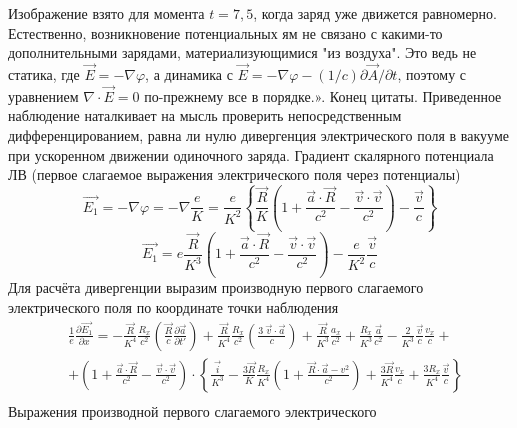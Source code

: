 \documentclass[11pt]{article}
\begin{document}
Изображение взято для момента \(t=7{,}5\), когда заряд уже движется
равномерно. Естественно, возникновение потенциальных ям не связано с
какими-то дополнительными зарядами, материализующимися "из воздуха". Это
ведь не статика, где \(\vec{E}=-\nabla \varphi\), а динамика с
\(\vec{E}=-\nabla \varphi -(1/c)\partial\vec{A}/ \partial t\), поэтому с
уравнением \(\nabla\cdot\vec{E}=0\) по-прежнему все в порядке.». Конец
цитаты. Приведенное наблюдение наталкивает на мысль проверить
непосредственным дифференцированием, равна ли нулю дивергенция
электрического поля в вакууме при ускоренном движении одиночного заряда.
Градиент скалярного потенциала ЛВ (первое слагаемое выражения
электрического поля через потенциалы)
\[\overrightarrow{{{E}_{1}}}=-\nabla \varphi =-\nabla \frac{e}{K}=\frac{e}{{{K}^{2}}}\left\{ \frac{\overrightarrow{R}}{K}\left( 1+\frac{\overrightarrow{a}\cdot \overrightarrow{R}}{{{c}^{2}}}-\frac{\overrightarrow{v}\cdot \overrightarrow{v}}{{{c}^{2}}} \right)-\frac{\overrightarrow{v}}{c} \right\}\]
\[\overrightarrow{{{E}_{1}}}=e\frac{\overrightarrow{R}}{{{K}^{3}}}\left( 1+\frac{\overrightarrow{a}\cdot \overrightarrow{R}}{{{c}^{2}}}-\frac{\overrightarrow{v}\cdot \overrightarrow{v}}{{{c}^{2}}} \right)-\frac{e}{{{K}^{2}}}\frac{\overrightarrow{v}}{c}\]
Для расчёта дивергенции выразим производную первого слагаемого
электрического поля по координате точки наблюдения \[\begin{align}
  & \frac{1}{e}\frac{\partial \overrightarrow{{{E}_{1}}}}{\partial x}=-\frac{\overrightarrow{R}}{{{K}^{4}}}\frac{{{R}_{x}}}{{{c}^{2}}}\left( \frac{\overrightarrow{R}}{c}\frac{\partial \overrightarrow{a}}{\partial t'} \right)+\frac{\overrightarrow{R}}{{{K}^{4}}}\frac{{{R}_{x}}}{{{c}^{2}}}\left( \frac{3\ \overrightarrow{v}\cdot \overrightarrow{a}}{c} \right)+\frac{\overrightarrow{R}}{{{K}^{3}}}\frac{{{a}_{x}}}{{{c}^{2}}}+\frac{{{R}_{x}}}{{{K}^{3}}}\frac{\overrightarrow{a}}{{{c}^{2}}}-\frac{2}{{{K}^{3}}}\frac{\overrightarrow{v}}{c}\frac{{{v}_{x}}}{c}+ \\
 & +\left( 1+\frac{\overrightarrow{a}\cdot \overrightarrow{R}}{{{c}^{2}}}-\frac{\overrightarrow{v}\cdot \overrightarrow{v}}{{{c}^{2}}} \right)\cdot \left\{ \frac{\overrightarrow{i}}{{{K}^{3}}}-\frac{3\overrightarrow{R}}{K}\frac{{{R}_{x}}}{{{K}^{4}}}\left( 1+\frac{\overrightarrow{R}\cdot \overrightarrow{a}-{{v}^{2}}}{{{c}^{2}}} \right)+\frac{3\overrightarrow{R}}{{{K}^{4}}}\frac{{{v}_{x}}}{c}+\frac{3{{R}_{x}}}{{{K}^{4}}}\frac{\overrightarrow{v}}{c} \right\} \\
\end{align}\] Выражения производной первого слагаемого электрического
\end{document}
